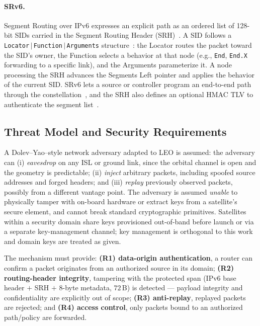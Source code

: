 \paragraph{SRv6.}
Segment Routing over IPv6 expresses an explicit path as an ordered list of
128-bit SIDs carried in the Segment Routing Header (SRH)~\cite{rfc8402,rfc8754,srsurvey}. A SID follows a \texttt{Locator$\,|\,$Function$\,|\,$Arguments}
structure~\cite{rfc8986}: the Locator routes the packet toward the SID's owner,
the Function selects a behavior at that node (e.g., \texttt{End}, \texttt{End.X}
forwarding to a specific link), and the Arguments parameterize it. A node
processing the SRH advances the Segments Left pointer and applies the behavior
of the current SID. SRv6 lets a source or controller program an end-to-end path
through the constellation~\cite{michel2019,bhattacherjee2020}, and the SRH also defines an optional HMAC TLV to
authenticate the segment list~\cite{rfc8754,abdelsalam2021}.

\subsection{Threat Model and Security Requirements}
\label{sec:threat}


A Dolev--Yao--style network adversary adapted to LEO is assumed: the adversary
can (i) \emph{eavesdrop} on any ISL or ground link, since the orbital channel
is open and the geometry is predictable; (ii) \emph{inject} arbitrary packets,
including spoofed source addresses and forged headers; and (iii) \emph{replay}
previously observed packets, possibly from a different vantage point. The
adversary is assumed \emph{unable} to physically tamper with on-board hardware or extract
keys from a satellite's secure element, and cannot break standard cryptographic
primitives. Satellites within a security domain share keys provisioned
out-of-band before launch or via a separate key-management channel; key
management is orthogonal to this work and domain keys are treated as given.


The mechanism must provide: \textbf{(R1) data-origin authentication}, a router
can confirm a packet originates from an authorized source in its domain;
\textbf{(R2) routing-header integrity}, tampering with the protected span
(IPv6 base header $+$ SRH $+$ 8-byte metadata, $72$\,B) is detected —
payload integrity and confidentiality are explicitly out of scope;
\textbf{(R3) anti-replay}, replayed packets are rejected; and \textbf{(R4)
access control}, only packets bound to an authorized path/policy are forwarded.


